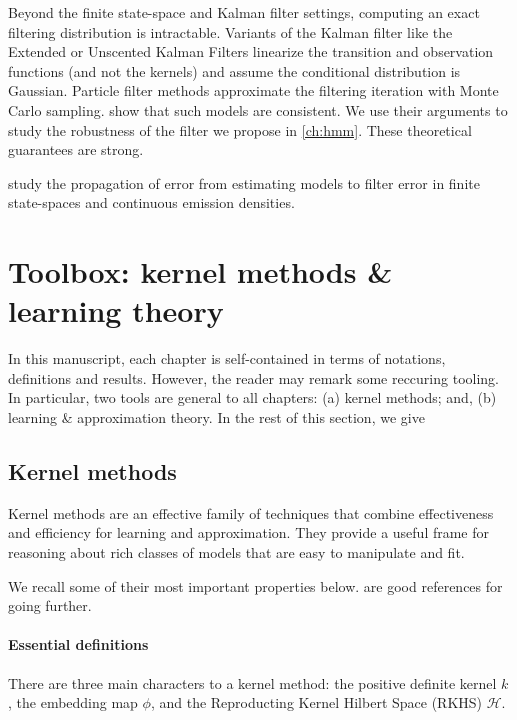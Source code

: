Beyond the finite state-space and Kalman filter settings, computing an exact filtering distribution is intractable. Variants of the Kalman filter like the Extended or Unscented Kalman Filters linearize the transition and observation functions (and not the kernels) and assume the conditional distribution is Gaussian\cite{sarkka}. Particle filter methods approximate the filtering iteration with Monte Carlo sampling\cite{pf,smc}. \cite{oudjane,legland,} show that such models are consistent. We use their arguments to study the robustness of the filter we propose in \cref{ch:hmm}. These theoretical guarantees are strong.

\cite{castro,mitrophanov} study the propagation of error from estimating models to filter error in finite state-spaces and continuous emission densities.

\section{Toolbox: kernel methods \& learning theory}\label{sec:tools}
In this manuscript, each chapter is self-contained in terms of notations, definitions and results. However, the reader may remark some reccuring tooling. In particular, two tools are general to all chapters: (a) kernel methods; and, (b) learning \& approximation theory. In the rest of this section, we give


\subsection{Kernel methods}
Kernel methods are an effective family of techniques that combine effectiveness and efficiency for learning and approximation. They provide a useful frame for reasoning about rich classes of models that are easy to manipulate and fit.

We recall some of their most important properties below. \cite{shawe-tayulor, scholkoptf,kernels-mva} are good references for going further.

\paragraph{Essential definitions} There are three main characters to a kernel method: the positive definite kernel $k$, the embedding map $\phi$, and the Reproducting Kernel Hilbert Space (RKHS) $\mathcal H$.

